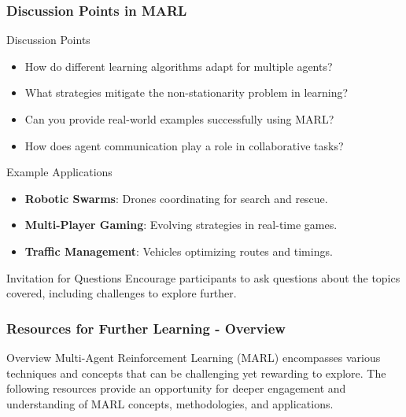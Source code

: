 \documentclass[aspectratio=169]{beamer}
\begin{document}
\begin{frame}[fragile]
    \frametitle{Discussion Points in MARL}
    \begin{block}{Discussion Points}
        \begin{itemize}
            \item How do different learning algorithms adapt for multiple agents?
            \item What strategies mitigate the non-stationarity problem in learning?
            \item Can you provide real-world examples successfully using MARL?
            \item How does agent communication play a role in collaborative tasks?
        \end{itemize}
    \end{block}

    \begin{block}{Example Applications}
        \begin{itemize}
            \item \textbf{Robotic Swarms}: Drones coordinating for search and rescue.
            \item \textbf{Multi-Player Gaming}: Evolving strategies in real-time games.
            \item \textbf{Traffic Management}: Vehicles optimizing routes and timings.
        \end{itemize}
    \end{block}

    \begin{block}{Invitation for Questions}
        Encourage participants to ask questions about the topics covered, including challenges to explore further.
    \end{block}
\end{frame}

\begin{frame}[fragile]
    \frametitle{Resources for Further Learning - Overview}
    \begin{block}{Overview}
    Multi-Agent Reinforcement Learning (MARL) encompasses various techniques and concepts that can be challenging yet rewarding to explore. The following resources provide an opportunity for deeper engagement and understanding of MARL concepts, methodologies, and applications.
    \end{block}
\end{frame}
\end{document}
